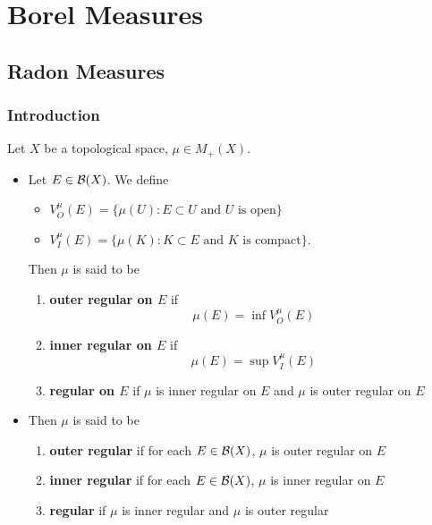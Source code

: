 \documentclass{book}
\begin{document}
	
	
	
	
	
	

	
	
	
	\newpage
	\chapter{Borel Measures}
	
	\section{Radon Measures}
	
	\subsection{Introduction}
	
	\begin{defn}  
	Let $X$ be a topological space, $\mu \in M_+(X)$.
	\begin{itemize}
		\item Let $E \in \mathcal{B}(X)$. We define 
		\begin{itemize}
			\item $V^{\mu}_O(E) =  \{ \mu(U): E \subset U \text{ and $U$ is open}\}$
			\item $V^{\mu}_I(E) = \{ \mu(K): K \subset E \text{ and $K$ is compact}\}$.
		\end{itemize}
		Then $\mu$ is said to be 
		\begin{enumerate}
			\item \textbf{outer regular on $E$} if
			$$\mu(E) = \inf V^{\mu}_O(E) $$
			\item \textbf{inner regular on $E$} if
			$$\mu(E) = \sup V^{\mu}_I(E) $$
			\item \textbf{regular on $E$} if $\mu$ is inner regular on $E$ and $\mu$ is outer regular on $E$
		\end{enumerate}
		\item Then $\mu$ is said to be 
		\begin{enumerate}
			\item  \textbf{outer regular} if for each $E \in \mathcal{B}(X)$, $\mu$ is outer regular on $E$
			\item  \textbf{inner regular} if for each $E \in \mathcal{B}(X)$, $\mu$ is inner regular on $E$
			\item  \textbf{regular} if $\mu$ is inner regular and $\mu$ is outer regular
		\end{enumerate}
	\end{itemize}
	\end{defn}
\end{document}
